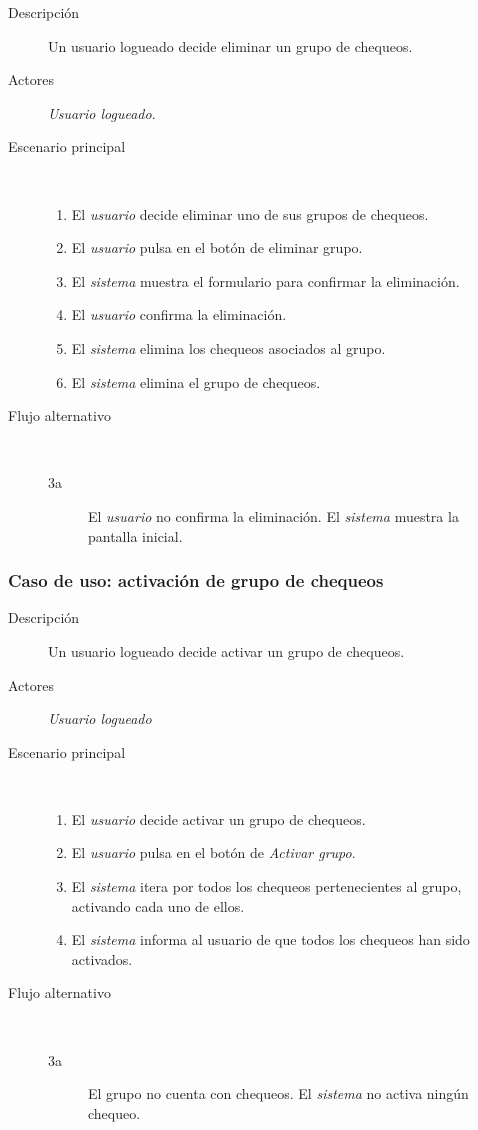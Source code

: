 \begin{description}
\item[Descripción] Un usuario logueado decide eliminar un grupo de chequeos.
\item[Actores] \textit{Usuario logueado}.
\item[Escenario principal] $\quad$
  \begin{enumerate}
  \item El \textit{usuario} decide eliminar uno de sus grupos de chequeos.
  \item El \textit{usuario} pulsa en el botón de eliminar grupo.
  \item El \textit{sistema} muestra el formulario para confirmar la eliminación.
  \item El \textit{usuario} confirma la eliminación.
  \item El \textit{sistema} elimina los chequeos asociados al grupo.
  \item El \textit{sistema} elimina el grupo de chequeos.
  \end{enumerate}
\item[Flujo alternativo] $\quad$
  \begin{description}
  \item[3a] El \textit{usuario} no confirma la eliminación. El \textit{sistema}
    muestra la pantalla inicial.
  \end{description}
\end{description}

\subsubsection{Caso de uso: activación de grupo de chequeos}

\begin{description}
\item[Descripción] Un usuario logueado decide activar un grupo de chequeos.
\item[Actores] \textit{Usuario logueado}
\item[Escenario principal] $\quad$
  \begin{enumerate}
  \item El \textit{usuario} decide activar un grupo de chequeos.
  \item El \textit{usuario} pulsa en el botón de \textit{Activar grupo}.
  \item El \textit{sistema} itera por todos los chequeos pertenecientes al
    grupo, activando cada uno de ellos.
  \item El \textit{sistema} informa al usuario de que todos los chequeos han
    sido activados.
  \end{enumerate}

\item[Flujo alternativo] $\quad$
  \begin{description}
  \item[3a] El grupo no cuenta con chequeos. El \textit{sistema} no activa
    ningún chequeo.
  \end{description}
\end{description}

